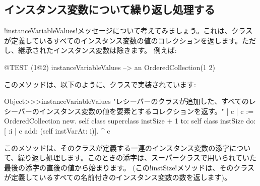\documentclass[a4paper,10pt,twoside]{book}
\begin{document}
\subsection{インスタンス変数について繰り返し処理する}

\ct!instanceVariableValues!メッセージについて考えてみましょう。これは、クラスが定義しているすべてのインスタンス変数の値のコレクションを返します。ただし、継承されたインスタンス変数は除きます。
例えば:
\begin{code}{@TEST}
(1@2) instanceVariableValues --> an OrderedCollection(1 2)
\end{code}

このメソッドは、以下のように、クラスで実装されています: %
\begin{code}{}
Object>>>instanceVariableValues
	"レシーバーのクラスが追加した、すべてのレシーバーのインスタンス変数の値を要素とするコレクションを返す。"	
	| c |
	c := OrderedCollection new.
	self class superclass instSize + 1
		to: self class instSize
		do: [ :i | c add: (self instVarAt: i)].
	^ c
\end{code}

このメソッドは、そのクラスが定義する一連のインスタンス変数の添字について、繰り返し処理します。このときの添字は、スーパークラスで用いられていた最後の添字の直後の値から始まります。
(この\ct!instSize!メソッドは、そのクラスが定義しているすべての名前付きのインスタンス変数の数を返します)。

\end{document}
